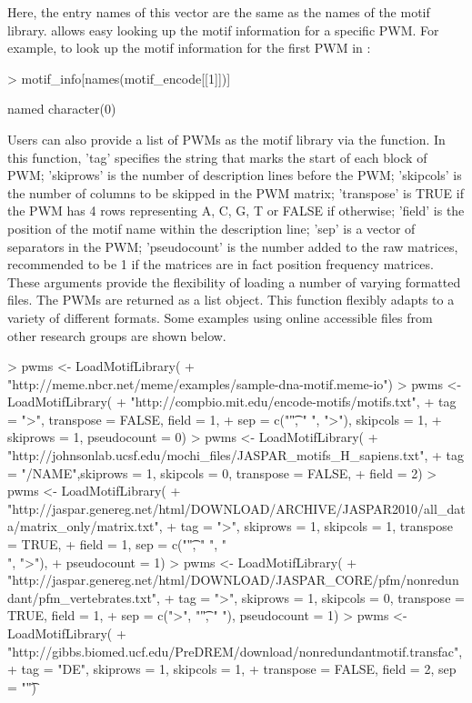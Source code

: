 \documentclass[a4paper,10pt]{article}
\begin{document}
Here, the entry names of this vector are the same as the names of the motif library.  allows easy looking up the motif information for a specific PWM. For example, to look up the motif information for the first PWM in :

\begin{Schunk}
\begin{Sinput}
> motif_info[names(motif_encode[[1]])]
\end{Sinput}
\begin{Soutput}
named character(0)
\end{Soutput}
\end{Schunk}


Users can also provide a list of PWMs as the motif library via the  function. In this function, 'tag' specifies the string that marks the start of each block of PWM; 'skiprows' is the number of description lines before the PWM; 'skipcols' is the number of columns to be skipped in the PWM matrix; 'transpose' is TRUE if the PWM has 4 rows representing A, C, G, T or FALSE if otherwise; 'field' is the position of the motif name within the description line; 'sep' is a vector of separators in the PWM; 'pseudocount' is the number added to the raw matrices, recommended to be 1 if the matrices are in fact position frequency matrices. These arguments provide the flexibility of loading a number of varying formatted files. The PWMs are returned as a list object. This function flexibly adapts to a variety of different formats. Some examples using online accessible files from other research groups are shown below.

\begin{Schunk}
\begin{Sinput}
> pwms <- LoadMotifLibrary(
+  "http://meme.nbcr.net/meme/examples/sample-dna-motif.meme-io")
> pwms <- LoadMotifLibrary(
+  "http://compbio.mit.edu/encode-motifs/motifs.txt",
+  tag = ">", transpose = FALSE, field = 1, 
+  sep = c("\t", " ", ">"), skipcols = 1, 
+  skiprows = 1, pseudocount = 0)
> pwms <- LoadMotifLibrary(
+  "http://johnsonlab.ucsf.edu/mochi_files/JASPAR_motifs_H_sapiens.txt",
+  tag = "/NAME",skiprows = 1, skipcols = 0, transpose = FALSE,
+  field = 2)
> pwms <- LoadMotifLibrary(
+  "http://jaspar.genereg.net/html/DOWNLOAD/ARCHIVE/JASPAR2010/all_data/matrix_only/matrix.txt", 
+  tag = ">", skiprows = 1, skipcols = 1, transpose = TRUE, 
+  field = 1, sep = c("\t", " ", "\\[", "\\]", ">"),
+  pseudocount = 1)
> pwms <- LoadMotifLibrary(
+  "http://jaspar.genereg.net/html/DOWNLOAD/JASPAR_CORE/pfm/nonredundant/pfm_vertebrates.txt",
+  tag = ">", skiprows = 1, skipcols = 0, transpose = TRUE, field = 1, 
+  sep = c(">", "\t", " "), pseudocount = 1)
> pwms <- LoadMotifLibrary(
+  "http://gibbs.biomed.ucf.edu/PreDREM/download/nonredundantmotif.transfac", 
+  tag = "DE", skiprows = 1, skipcols = 1, 
+  transpose = FALSE, field = 2, sep = "\t")
\end{Sinput}
\end{Schunk}
\end{document}
